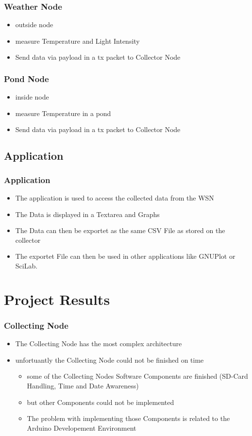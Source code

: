 \documentclass{beamer}
\begin{document}
\frame
{
	\frametitle{Weather Node}
	\begin{itemize}
	\item outside node 
	\item measure Temperature and Light Intensity
	\item Send data via payload in a tx packet to Collector Node
	\end{itemize}		
}

\frame
{
	\frametitle{Pond Node}
	\begin{itemize}
	\item inside node
	\item measure Temperature in a pond
	\item Send data via payload in a tx packet to Collector Node
	\end{itemize}
	
}

\subsection{Application}
\frame
{
	\frametitle{Application}
	
	\begin{itemize}
	
	\item The application is used to access the collected data from the WSN
	
	\item The Data is displayed in a Textarea and Graphs
	
	\item The Data can then be exportet as the same CSV File as stored on the collector
	
	\item The exportet File can then be used in other applications like GNUPlot or SciLab.
	
	\end{itemize}

}


\section{Project Results}
\frame
{
	\frametitle{Collecting Node}
	\begin{itemize}
	\item The Collecting Node has the most complex architecture
	\item unfortuantly the Collecting Node could not be finished on time
	\begin{itemize}
	\item some of the Collecting Nodes Software Components are finished (SD-Card Handling, Time and Date Awareness)
	\item but other Components could not be implemented
	\item The problem with implementing those Components is related to the Arduino Developement Environment
	\end{itemize}
	\end{itemize}
}
\end{document}
